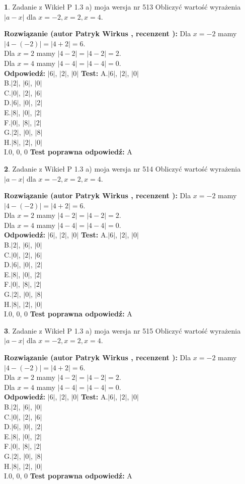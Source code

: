 \documentclass[12pt, a4paper]{article}
\theoremstyle{definition} %
\newtheorem{zad}{}
\newcommand{\zadStart}[1]{\begin{zad}#1\newline}
\newcommand{\zadStop}{\end{zad}}
\newcommand{\rozwStart}[2]{\noindent \textbf{Rozwiązanie (autor #1 , recenzent #2): }\newline}
\newcommand{\rozwStop}{\newline}
\newcommand{\odpStart}{\noindent \textbf{Odpowiedź:}\newline}
\newcommand{\odpStop}{\newline}
\newcommand{\testStart}{\noindent \textbf{Test:}\newline}
\newcommand{\testStop}{\newline}
\newcommand{\kluczStart}{\noindent \textbf{Test poprawna odpowiedź:}\newline}
\newcommand{\kluczStop}{\newline}
\begin{document}
\zadStart{Zadanie z Wikieł P 1.3 a) moja wersja nr 513}
Obliczyć wartość wyrażenia $|a - x|$ dla $x=-2,x=2,x=4$.
\zadStop
\rozwStart{Patryk Wirkus}{}
Dla $x = -2$ mamy $|4 - (-2)| = |4 + 2| = 6$.\\
Dla $x = 2$ mamy $|4 - 2| = |4 - 2| = 2$.\\
Dla $x = 4$ mamy $|4 - 4| = |4 - 4| = 0$.\\
\rozwStop
\odpStart
$|6|$, $|2|$, $|0|$
\odpStop
\testStart
A.$|6|$, $|2|$, $|0|$\\
B.$|2|$, $|6|$, $|0|$\\
C.$|0|$, $|2|$, $|6|$\\
D.$|6|$, $|0|$, $|2|$\\
E.$|8|$, $|0|$, $|2|$\\
F.$|0|$, $|8|$, $|2|$\\
G.$|2|$, $|0|$, $|8|$\\
H.$|8|$, $|2|$, $|0|$\\
I.$0$, $0$, $0$
\testStop
\kluczStart
A
\kluczStop



\zadStart{Zadanie z Wikieł P 1.3 a) moja wersja nr 514}
Obliczyć wartość wyrażenia $|a - x|$ dla $x=-2,x=2,x=4$.
\zadStop
\rozwStart{Patryk Wirkus}{}
Dla $x = -2$ mamy $|4 - (-2)| = |4 + 2| = 6$.\\
Dla $x = 2$ mamy $|4 - 2| = |4 - 2| = 2$.\\
Dla $x = 4$ mamy $|4 - 4| = |4 - 4| = 0$.\\
\rozwStop
\odpStart
$|6|$, $|2|$, $|0|$
\odpStop
\testStart
A.$|6|$, $|2|$, $|0|$\\
B.$|2|$, $|6|$, $|0|$\\
C.$|0|$, $|2|$, $|6|$\\
D.$|6|$, $|0|$, $|2|$\\
E.$|8|$, $|0|$, $|2|$\\
F.$|0|$, $|8|$, $|2|$\\
G.$|2|$, $|0|$, $|8|$\\
H.$|8|$, $|2|$, $|0|$\\
I.$0$, $0$, $0$
\testStop
\kluczStart
A
\kluczStop



\zadStart{Zadanie z Wikieł P 1.3 a) moja wersja nr 515}
Obliczyć wartość wyrażenia $|a - x|$ dla $x=-2,x=2,x=4$.
\zadStop
\rozwStart{Patryk Wirkus}{}
Dla $x = -2$ mamy $|4 - (-2)| = |4 + 2| = 6$.\\
Dla $x = 2$ mamy $|4 - 2| = |4 - 2| = 2$.\\
Dla $x = 4$ mamy $|4 - 4| = |4 - 4| = 0$.\\
\rozwStop
\odpStart
$|6|$, $|2|$, $|0|$
\odpStop
\testStart
A.$|6|$, $|2|$, $|0|$\\
B.$|2|$, $|6|$, $|0|$\\
C.$|0|$, $|2|$, $|6|$\\
D.$|6|$, $|0|$, $|2|$\\
E.$|8|$, $|0|$, $|2|$\\
F.$|0|$, $|8|$, $|2|$\\
G.$|2|$, $|0|$, $|8|$\\
H.$|8|$, $|2|$, $|0|$\\
I.$0$, $0$, $0$
\testStop
\kluczStart
A
\kluczStop
\end{document}

